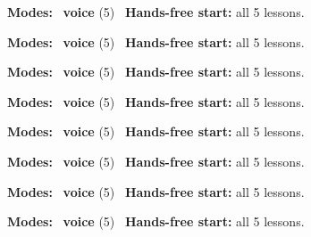 \expandafter\def\csname hlchaptermodality57\endcsname{%
  {\small\noindent
    \textbf{Modes:} \hlvoicesign{}~\textbf{voice} (5)\quad
    \hlvoicesign{}~\textbf{Hands-free start:} all 5 lessons.%
    \par}\medskip
}

\expandafter\def\csname hlchaptermodality58\endcsname{%
  {\small\noindent
    \textbf{Modes:} \hlvoicesign{}~\textbf{voice} (5)\quad
    \hlvoicesign{}~\textbf{Hands-free start:} all 5 lessons.%
    \par}\medskip
}

\expandafter\def\csname hlchaptermodality59\endcsname{%
  {\small\noindent
    \textbf{Modes:} \hlvoicesign{}~\textbf{voice} (5)\quad
    \hlvoicesign{}~\textbf{Hands-free start:} all 5 lessons.%
    \par}\medskip
}

\expandafter\def\csname hlchaptermodality60\endcsname{%
  {\small\noindent
    \textbf{Modes:} \hlvoicesign{}~\textbf{voice} (5)\quad
    \hlvoicesign{}~\textbf{Hands-free start:} all 5 lessons.%
    \par}\medskip
}

\expandafter\def\csname hlchaptermodality61\endcsname{%
  {\small\noindent
    \textbf{Modes:} \hlvoicesign{}~\textbf{voice} (5)\quad
    \hlvoicesign{}~\textbf{Hands-free start:} all 5 lessons.%
    \par}\medskip
}

\expandafter\def\csname hlchaptermodality62\endcsname{%
  {\small\noindent
    \textbf{Modes:} \hlvoicesign{}~\textbf{voice} (5)\quad
    \hlvoicesign{}~\textbf{Hands-free start:} all 5 lessons.%
    \par}\medskip
}

\expandafter\def\csname hlchaptermodality63\endcsname{%
  {\small\noindent
    \textbf{Modes:} \hlvoicesign{}~\textbf{voice} (5)\quad
    \hlvoicesign{}~\textbf{Hands-free start:} all 5 lessons.%
    \par}\medskip
}

\expandafter\def\csname hlchaptermodality64\endcsname{%
  {\small\noindent
    \textbf{Modes:} \hlvoicesign{}~\textbf{voice} (5)\quad
    \hlvoicesign{}~\textbf{Hands-free start:} all 5 lessons.%
    \par}\medskip
}
